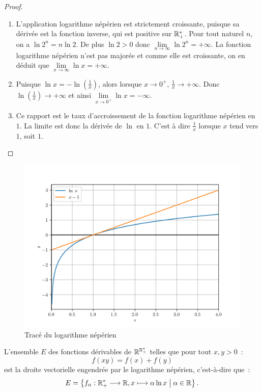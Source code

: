 \begin{proof}
  \begin{enumerate}
    \item L'application logarithme népérien est strictement croissante, puisque
      sa dérivée est la fonction inverse, qui est positive sur \(\mathbb{R}_{+}^{*}\).
      Pour tout naturel \(n\), on a \(\ln 2^n = n \ln 2\). De plus \(\ln 2 >0\)
      donc \(\lim\limits_{n \to \infty} \ln 2^n = + \infty\). La fonction
      logarithme népérien n'est pas majorée et comme elle est croissante, on en
      déduit que \(\lim\limits_{x \to \infty} \ln x = +\infty\).
    \item Puisque \(\ln x = - \ln\left(\frac{1}{x}\right)\), alors lorsque
      \(x\to 0^+\), \(\frac{1}{x} \to + \infty\). Donc \(\ln
      \left(\frac{1}{x}\right) \to +\infty\) et ainsi \(\lim\limits_{x \to 0^+}
      \ln x = - \infty\).
    \item Ce rapport est le taux d'accroissement de la fonction logarithme
      népérien en \(1\). La limite est donc la dérivée de \(\ln\) en \(1\).
      C'est à dire \(\frac{1}{x}\) lorsque \(x\) tend vers \(1\), soit \(1\).
  \end{enumerate}
\end{proof}

\begin{figure}
  \centering
  \includegraphics[scale = 0.7]{lognep.png}
  \caption{Tracé du logarithme népérien}\label{fig:traceln}
\end{figure}

\begin{theo}
  L'ensemble \(E\) des fonctions dérivables de \(\mathbb{R}^{\mathbb{R}_{+}^{*}}\) telles que
  pour tout \(x,y>0\)~:
  \begin{equation}\label{eq:fonclog}
    f(xy) = f(x)+f(y)
  \end{equation}
  est la droite vectorielle engendrée par le logarithme népérien, c'est-à-dire
  que~:
  \[E = \left\{f_{\alpha}:\mathbb{R}_{+}^{*} \longrightarrow{} \mathbb{R}, x \longmapsto{} \alpha \ln x\mathrel{}\middle|\mathrel{}\alpha
  \in \mathbb{R}\right\}.\]
\end{theo}

